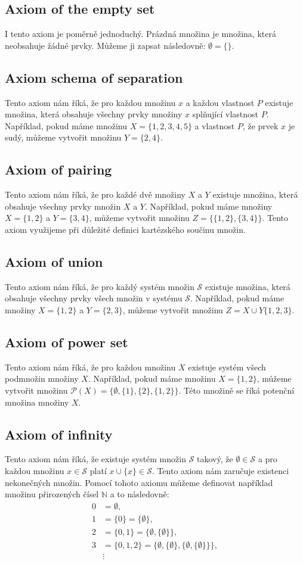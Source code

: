 \subsection{Axiom of the empty set}
I tento axiom je poměrně jednoduchý. Prázdná množina je množina, která neobsahuje žádné prvky. Můžeme ji zapsat následovně: $\emptyset = \{\}$.
\subsection{Axiom schema of separation}
Tento axiom nám říká, že pro každou množinu $x$ a každou vlastnost $P$ existuje množina, která obsahuje všechny prvky množiny $x$ splňující vlastnost $P$. Například, pokud máme množinu $X = \{1, 2, 3, 4, 5\}$ a vlastnost $P$, že prvek $x$ je sudý, můžeme vytvořit množinu $Y = \{2, 4\}$.
\subsection{Axiom of pairing}
Tento axiom nám říká, že pro každé dvě množiny $X$ a $Y$ existuje množina, která obsahuje všechny prvky množin $X$ a $Y$. Například, pokud máme množiny $X = \{1, 2\}$ a $Y = \{3, 4\}$, můžeme vytvořit množinu $Z = \{\{1, 2\}, \{3, 4\}\}$. Tento axiom využijeme při důležité definici kartézského součinu množin.
\subsection{Axiom of union}
Tento axiom nám říká, že pro každý systém množin $\mathcal{S}$ existuje množina, která obsahuje všechny prvky všech množin v systému $\mathcal{S}$. Například, pokud máme množiny $X = \{1, 2\}$ a $Y = \{2, 3\}$, můžeme vytvořit množinu $Z = X\cup Y \{1, 2, 3\}$.
\subsection{Axiom of power set}
Tento axiom nám říká, že pro každou množinu $X$ existuje systém všech podmnožin množiny $X$. Například, pokud máme množinu $X = \{1, 2\}$, můžeme vytvořit množinu $\mathcal{P}(X) = \{\emptyset, \{1\}, \{2\}, \{1, 2\}\}$. Této množině se říká potenční množina množiny $X$.
\subsection{Axiom of infinity} \label{axiom_of_infinity}
Tento axiom nám říká, že existuje systém množin $\mathcal{S}$ takový, že $\emptyset\in\mathcal{S}$ a pro každou množinu $x\in\mathcal{S}$ platí $x\cup\{x\}\in\mathcal{S}$. Tento axiom nám zaručuje existenci nekonečných množin. Pomocí tohoto axiomu můžeme definovat například množinu přirozených čísel $\mathbb{N}$ a to následovně:
\begin{align*}
  0 &= \emptyset,\\
  1 &= \{0\} = \{\emptyset\},\\
  2 &= \{0, 1\} = \{\emptyset, \{\emptyset\}\},\\
  3 &= \{0, 1, 2\} = \{\emptyset, \{\emptyset\}, \{\emptyset, \{\emptyset\}\}\},\\
  &\vdots
\end{align*}
